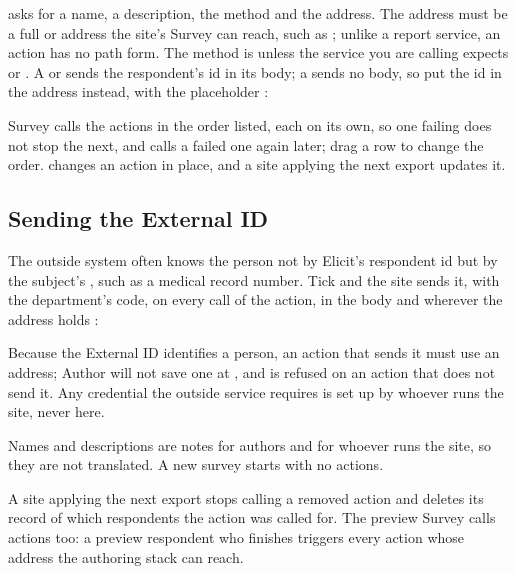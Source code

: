 \documentclass[11pt, a4paper]{article}
\begin{document}
 asks for a name, a description, the method and the address. The address must
be a full  or  address the site's Survey can reach, such as
; unlike a report service, an action has no
path form. The method is  unless the service you are calling expects  or
. A  or  sends the respondent's id in its body; a
 sends no body, so put the id in the address instead, with the placeholder
:

\begin{quote}
\end{quote}

Survey calls the actions in the order listed, each on its own, so one failing does not stop the
next, and calls a failed one again later; drag a row to change the order.  changes an
action in place, and a site applying the next export updates it.

\subsection{Sending the External ID}

The outside system often knows the person not by Elicit's respondent id but by the subject's
, such as a medical record number. Tick 
and the site sends it, with the department's code, on every call of the action, in the body and
wherever the address holds :

\begin{quote}
\end{quote}

Because the External ID identifies a person, an action that sends it must use an 
address; Author will not save one at , and  is refused on an
action that does not send it. Any credential the outside service requires is set up by whoever
runs the site, never here.

Names and descriptions are notes for authors and for whoever runs the site, so they are not
translated. A new survey starts with no actions.

\begin{elicitcaution}
A site applying the next export stops calling a removed action and deletes its record of
which respondents the action was called for. The preview Survey calls actions too: a preview
respondent who finishes triggers every action whose address the authoring stack can reach.
\end{elicitcaution}
\end{document}
